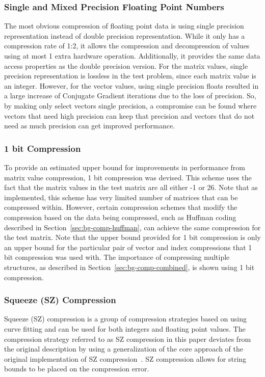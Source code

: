\subsubsection{Single and Mixed Precision Floating Point Numbers}
\label{sec:bg-comp-floatPrec}
The most obvious compression of floating point data is using single precision representation instead of double precision representation.
While it only has a compression rate of 1:2, it allows the compression and decompression of values using at most 1 extra hardware operation.
Additionally, it provides the same data access properties as the double precision version.
For the matrix values, single precision representation is lossless in the test problem, since each matrix value is an integer.
However, for the vector values, using single precision floats resulted in a large increase of Conjugate Gradient iterations due to the loss of precision.
So, by making only select vectors single precision, a compromise can be found where vectors that need high precision can keep that precision and vectors that do not need as much precision can get improved performance.

\subsubsection{1 bit Compression}
\label{sec:bg-comp-1bit}
To provide an estimated upper bound for improvements in performance from matrix value compression, 1 bit compression was devised.
This scheme uses the fact that the matrix values in the test matrix are all either -1 or 26.
Note that as implemented, this scheme has very limited number of matrices that can be compressed within.
However, certain compression schemes that modify the compression based on the data being compressed, such as Huffman coding described in Section~\ref{sec:bg-comp-huffman}, can achieve the same compression for the test matrix.
Note that the upper bound provided for 1 bit compression is only an upper bound for the particular pair of vector and index compressions that 1 bit compression was used with.
The importance of compressing multiple structures, as described in Section~\ref{sec:bg-comp-combined}, is shown using 1 bit compression.

\subsubsection{Squeeze (SZ) Compression}
\label{sec:bg-comp-sz}
Squeeze (SZ) compression is a group of compression strategies based on using curve fitting and can be used for both integers and floating point values.
The compression strategy referred to as SZ compression in this paper deviates from the original description by using a generalization of the core approach of the original implementation of SZ compression~\cite{Di:2016:SZ}.
SZ compression allows for string bounds to be placed on the compression error.

